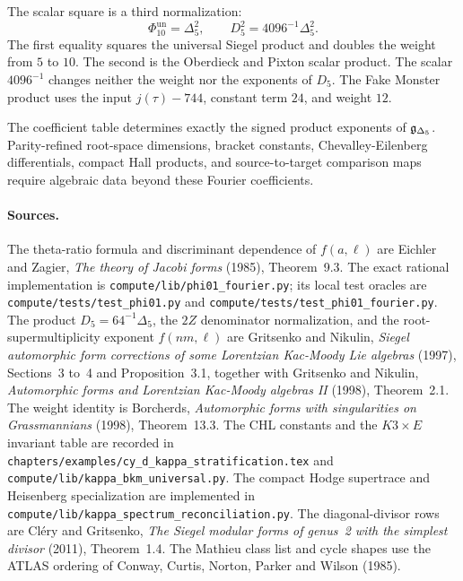 The scalar square is a third normalization:
\[
  \Phi_{10}^{\mathrm{un}}=\Delta_5^2,\qquad
  D_5^2=4096^{-1}\Delta_5^2 .
\]
The first equality squares the universal Siegel product and doubles the
weight from \(5\) to \(10\).  The second is the Oberdieck and Pixton
scalar product.  The scalar \(4096^{-1}\) changes neither the weight nor
the exponents of \(D_5\).  The Fake Monster product uses the input
\(j(\tau)-744\), constant term \(24\), and weight \(12\).

The coefficient table determines exactly the signed product exponents of
\(\mathfrak g_{\Delta_5}\).  Parity-refined root-space dimensions, bracket
constants, Chevalley-Eilenberg differentials, compact Hall products, and
source-to-target comparison maps require algebraic data beyond these
Fourier coefficients.

\paragraph{Sources.}
The theta-ratio formula and discriminant dependence of \(f(a,\ell)\)
are Eichler and Zagier, \emph{The theory of Jacobi forms} (1985),
Theorem~9.3.  The exact rational implementation is
\texttt{compute/lib/phi01\_fourier.py}; its local test oracles are
\texttt{compute/tests/test\_phi01.py} and
\texttt{compute/tests/test\_phi01\_fourier.py}.  The product
\(D_5=64^{-1}\Delta_5\), the \(2Z\) denominator normalization, and the
root-supermultiplicity exponent \(f(nm,\ell)\) are Gritsenko and
Nikulin, \emph{Siegel automorphic form corrections of some Lorentzian
Kac-Moody Lie algebras} (1997), Sections~3 to~4 and Proposition~3.1,
together with Gritsenko and Nikulin, \emph{Automorphic forms and
Lorentzian Kac-Moody algebras II} (1998), Theorem~2.1.  The weight
identity is Borcherds, \emph{Automorphic forms with singularities on
Grassmannians} (1998), Theorem~13.3.  The CHL constants and the
\(K3\times E\) invariant table are recorded in
\texttt{chapters/examples/cy\_d\_kappa\_stratification.tex} and
\texttt{compute/lib/kappa\_bkm\_universal.py}.  The compact Hodge
supertrace and Heisenberg specialization are implemented in
\texttt{compute/lib/kappa\_spectrum\_reconciliation.py}.  The
diagonal-divisor rows are Cl\'ery and Gritsenko,
\emph{The Siegel modular forms of genus~2 with the simplest divisor}
(2011), Theorem~1.4.  The Mathieu class list and cycle shapes use the
ATLAS ordering of Conway, Curtis, Norton, Parker and Wilson (1985).
